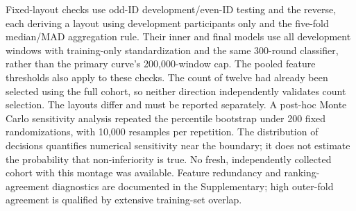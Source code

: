 Fixed-layout checks use odd-ID development/even-ID testing and the reverse, each deriving a layout using development participants only and the five-fold median/MAD aggregation rule. Their inner and final models use all development windows with training-only standardization and the same 300-round classifier, rather than the primary curve's 200,000-window cap. The pooled feature thresholds also apply to these checks. The count of twelve had already been selected using the full cohort, so neither direction independently validates count selection. The layouts differ and must be reported separately. A post-hoc Monte Carlo sensitivity analysis repeated the percentile bootstrap under 200 fixed randomizations, with 10,000 resamples per repetition. The distribution of decisions quantifies numerical sensitivity near the boundary; it does not estimate the probability that non-inferiority is true. No fresh, independently collected cohort with this montage was available. Feature redundancy and ranking-agreement diagnostics are documented in the Supplementary; high outer-fold agreement is qualified by extensive training-set overlap.
